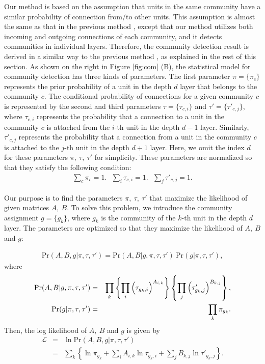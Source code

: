 \documentclass[12pt]{article} %
\begin{document}
Our method is based on the assumption that units in the same community have a similar probability of connection from/to other units. 
This assumption is almost the same as that in the previous method \cite{Newman2007}, except that our method utilizes both incoming and outgoing connections of each community, and it detects communities in individual layers. 
Therefore, the community detection result is derived in a similar way to the previous method \cite{Newman2007}, as explained in the rest of this section. 
As shown on the right in Figure \ref{fig:com} (B), the statistical model for community detection has three kinds of parameters. The first parameter $\pi=\{\pi_c\}$ represents the prior probability of a unit in the depth $d$ layer that belongs to the community $c$. The conditional probability of connections for a given community $c$ is represented by the second and third parameters $\tau=\{\tau_{c,i}\}$ and $\tau'=\{\tau'_{c,j}\}$, where $\tau_{c,i}$ represents the probability that a connection to a unit in the community $c$ is attached from the $i$-th unit in the depth $d-1$ layer. Similarly, $\tau'_{c,j}$ represents the probability that a connection from a unit in the community $c$ is attached to the $j$-th unit in the depth $d+1$ layer. 
Here, we omit the index $d$ for these parameters $\pi,\ \tau,\ \tau'$ for simplicity. 
These parameters are normalized so that they satisfy the following condition:
\begin{eqnarray}
  \sum_c \pi_c=1.\ \ \  \sum_i \tau_{c,i}=1.\ \ \  \sum_j \tau'_{c,j}=1.
  \label{eq:normalization}
\end{eqnarray}

Our purpose is to find the parameters $\pi,\ \tau,\ \tau'$ that maximize the likelihood of given matrices $A,\ B$. To solve this problem, we introduce the community assignment $g=\{g_k\}$, where $g_k$ is the community of the $k$-th unit in the depth $d$ layer. The parameters are optimized so that they maximize the likelihood of $A,\ B$ and $g$: 

\begin{eqnarray*}
  \mathrm{Pr}(A,B,g|\pi,\tau,\tau')=\mathrm{Pr}(A,B|g,\pi,\tau,\tau')\ \mathrm{Pr}(g|\pi,\tau,\tau'),
\end{eqnarray*}
where 
\begin{eqnarray*}
  \mathrm{Pr}(A,B|g,\pi,\tau,\tau') &=& \prod_k \left\{ \prod_i {\Bigl(\tau_{g_k,i}\Bigr)}^{A_{i,k}} \right\} \left\{ \prod_j {\Bigl(\tau'_{g_k,j}\Bigr)}^{B_{k,j}} \right\},\\
  \mathrm{Pr}(g|\pi,\tau,\tau') &=& \prod_k \pi_{g_k}.
\end{eqnarray*}
Then, the log likelihood of $A,\ B$ and $g$ is given by
\begin{eqnarray*}
  \mathcal{L} &=& \ln \mathrm{Pr}(A,B,g|\pi,\tau,\tau')\\
  &=& \sum_k \left\{ \ln \pi_{g_k} +\sum_i A_{i,k} \ln \tau_{g_k,i} +\sum_j B_{k,j} \ln \tau'_{g_k,j} \right\}.
\end{eqnarray*}
\end{document}
